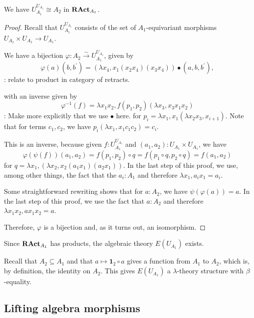 \begin{lemma}
  We have $ U_{A_1}^{U_{A_1}} \cong A_2 $ in $ \mathbf{RAct}_{A_1} $.
\end{lemma}
\begin{proof}
  Recall that $ U_{A_1}^{U_{A_1}} $ consists of the set of $ A_1 $-equivariant morphisms $ U_{A_1} \times U_{A_1} \to U_{A_1} $.

  We have a bijection $ \varphi: A_2 \xrightarrow{\sim} U_{A_1}^{U_{A_1}} $, given by
  \[ \varphi(a)(b, b^\prime) = (\lambda x_4, x_1 (x_2 x_4) (x_3 x_4)) \bullet (a, b, b^\prime), \]
  \TODO: relate to product in category of retracts.

  with an inverse given by
  \[ \varphi^{-1}(f) = \lambda x_1 x_2, f(p_1, p_2)(\lambda x_3, x_3 x_1 x_2) \]
  \TODO: Make more explicitly that we use $ \bullet $ here.
  for $ p_i = \lambda x_1, x_1 (\lambda x_2 x_3, x_{i + 1}) $. Note that for terms $ c_1, c_2 $, we have $ p_i (\lambda x_1, x_1 c_1 c_2) = c_i $.

  This is an inverse, because given $ f: U_{A_1}^{U_{A_1}} $ and $ (a_1, a_2): U_{A_1} \times U_{A_1} $, we have
  \[ \varphi(\psi(f))(a_1, a_2) = f(p_1, p_2) \circ q = f(p_1 \circ q, p_2 \circ q) = f(a_1, a_2) \]
  for $ q = \lambda x_1, (\lambda x_2, x_2 (a_1 x_1) (a_2 x_1)) $. In the last step of this proof, we use, among other things, the fact that the $ a_i : A_1 $ and therefore $ \lambda x_1, a_i x_1 = a_i $.

  Some straightforward rewriting shows that for $ a: A_2 $, we have $ \psi(\varphi(a)) = a $. In the last step of this proof, we use the fact that $ a : A_2 $ and therefore $ \lambda x_1 x_2, a x_1 x_2 = a $.

  Therefore, $ \varphi $ is a bijection and, as it turns out, an isomorphism.
\end{proof}

\begin{definition}
  Since $ \mathbf{RAct}_{A_1} $ has products, the algebraic theory $ E(U_{A_1}) $ exists.

  Recall that $ A_2 \subseteq A_1 $ and that $ a \mapsto \mathbf 1_2 \circ a $ gives a function from $ A_1 $ to $ A_2 $, which is, by definition, the identity on $ A_2 $. This gives $ E(U_{A_1}) $ a $ \lambda $-theory structure with $ \beta $-equality.
\end{definition}


\subsection{Lifting algebra morphisms}

